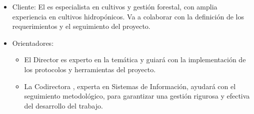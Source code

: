 \begin{itemize}
	\item Cliente: El \clientename\hspace{1px} es especialista en cultivos y gestión
	      forestal, con amplia experiencia en cultivos hidropónicos. Va a colaborar con
	      la definición de los requerimientos y el seguimiento del proyecto.
	\item Orientadores:
	      \begin{itemize}
		      \item El Director \supname\hspace{1px} es experto en la temática y guiará con la
		            implementación de los protocolos y herramientas del proyecto.
		      \item La Codirectora \cosupname , experta en Sistemas de Información, ayudará con el
		            seguimiento metodológico, para garantizar una gestión rigurosa y efectiva del
		            desarrollo del trabajo.
	      \end{itemize}
\end{itemize}
